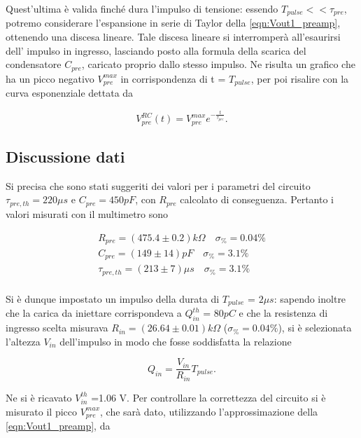 \documentclass{article}
\begin{document}
Quest'ultima è valida finché dura l'impulso di tensione: essendo $T_{pulse} << \tau_{pre}$, potremo considerare l'espansione in 
serie di Taylor della \ref{eqn:Vout1_preamp}, ottenendo una discesa lineare. Tale discesa lineare si interromperà all'esaurirsi dell'
impulso in ingresso, lasciando posto alla formula della scarica del condensatore $C_{pre}$, caricato proprio dallo stesso impulso.
Ne risulta un grafico che ha un picco negativo $V_{pre}^{max}$ in corrispondenza di t = $T_{pulse}$, per poi risalire con la curva esponenziale
dettata da

\begin{equation}
    \label{eqn:Vout2_preamp}
    V_{pre}^{RC}(t) = V_{pre}^{max}e^{-\frac{t}{\tau_{pre}}}.
\end{equation}

\subsection{Discussione dati}

Si precisa che sono stati suggeriti dei valori per i parametri del circuito $\tau_{pre,th} = 220 \mu s$ e $C_{pre} = 450 pF$, con $R_{pre}$ calcolato di 
conseguenza. Pertanto i valori misurati con il multimetro sono

\begin{align*}
    R_{pre} = (475.4 \pm 0.2)k\Omega \quad \sigma_{\%}=0.04 \% \\    
    C_{pre} = (149 \pm 14) pF \quad \sigma_{\%}=3.1 \%    \\
    \tau_{pre,th} = (213 \pm 7)\mu s \quad \sigma_{\%}=3.1 \%     \\
\end{align*}

Si è dunque impostato un impulso della durata di $T_{pulse}$ = $2 \mu s$: sapendo inoltre che la carica da iniettare 
corrispondeva a $Q_{in}^{th}$ = $80 pC$ e che la resistenza di ingresso scelta misurava $R_{in}=(26.64\pm0.01) k\Omega$ ($\sigma_{\%}=0.04\%$), 
si è selezionata l'altezza $V_{in}$ dell'impulso in modo che fosse soddisfatta la relazione

\begin{equation}
    \label{eqn:Qin}
    Q_{in} = \frac{V_{in}}{R_{in}} T_{pulse}.
\end{equation}

Ne si è ricavato $V_{in}^{th}$ =1.06 V. Per controllare la correttezza del circuito si è misurato il picco $V_{pre}^{max}$, che sarà
dato, utilizzando l'approssimazione della \ref{eqn:Vout1_preamp}, da
\end{document}
